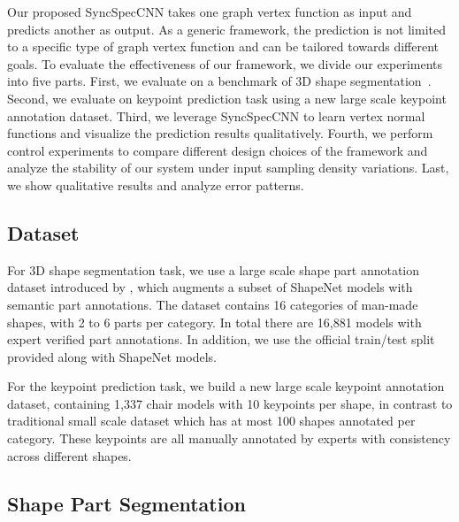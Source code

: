 Our proposed SyncSpecCNN takes one graph vertex function as input and predicts another as output. As a generic framework, the prediction is not limited to a specific type of graph vertex function and can be tailored towards different goals. To evaluate the effectiveness of our framework, we divide our experiments into five parts. First, we evaluate on a benchmark of 3D shape segmentation~\cite{shapenet2015,Yi16}. Second, we evaluate on keypoint prediction task using a new large scale keypoint annotation dataset. Third, we leverage SyncSpecCNN to learn vertex normal functions and visualize the prediction results qualitatively. Fourth, we perform control experiments to compare different design choices of the framework and analyze the stability of our system under input sampling density variations. Last, we show qualitative results and analyze error patterns.

\subsection{Dataset}
For 3D shape segmentation task, we use a large scale shape part annotation dataset introduced by \cite{Yi16}, which augments a subset of ShapeNet models with semantic part annotations. The dataset contains 16 categories of man-made shapes, with 2 to 6 parts per category. In total there are 16,881 models with expert verified part annotations. In addition, we use the official train/test split provided along with ShapeNet models.

For the keypoint prediction task, we build a new large scale keypoint annotation dataset, containing 1,337 chair models with 10 keypoints per shape, in contrast to traditional small scale dataset \cite{kim2013learning} which has at most 100 shapes annotated per category. These keypoints are all manually annotated by experts with consistency across different shapes. %

\subsection{Shape Part Segmentation} 

